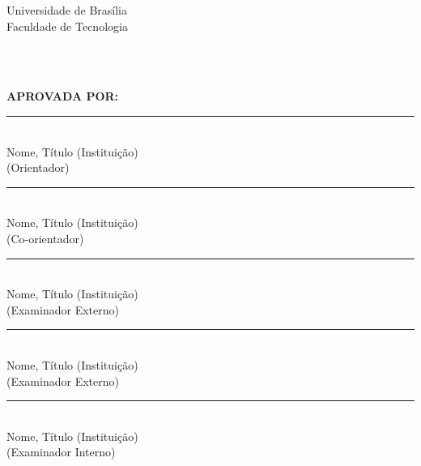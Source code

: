 \setlength{\headsep}{0.5cm}
%
\begin{bf}
\begin{center}
{\normalsize Universidade de Brasília}\\
{\normalsize Faculdade de Tecnologia}\\
{\normalsize \tdepartment}\\

\vspace{7mm}

{\large {\bf \ttitle\\}}

\vspace{5mm}
%
{\large \tauthor}
\end{center}
\end{bf}
\vspace{1mm}
\vspace{1mm}

\noindent\MakeUppercase{{\bf Aprovada por:\\}}


\begin{bf}
\vspace{2.5mm}
\noindent\rule{150mm}{0.1mm}\\
{ Nome, Título (Instituição) }\\
{(Orientador)}

\vspace{2.5mm}
\noindent\rule{150mm}{0.1mm}\\
{ Nome, Título (Instituição) }\\
{(Co-orientador)}

\vspace{2.5mm}
\noindent\rule{150mm}{0.1mm}\\
{ Nome, Título (Instituição) }\\
{(Examinador Externo)}

\vspace{2.5mm}
\noindent\rule{150mm}{0.1mm}\\
{ Nome, Título (Instituição) }\\
{(Examinador Externo)}

\vspace{2.5mm}
\noindent\rule{150mm}{0.1mm}\\
{ Nome, Título (Instituição) }\\
{(Examinador Interno)}

%
\vspace{2.5mm}
\end{bf}
%
\pagebreak 